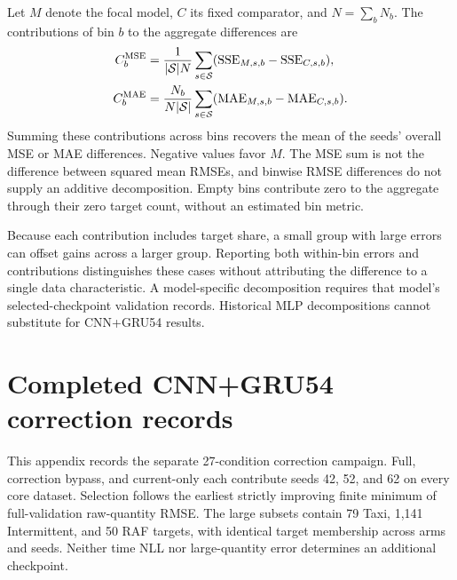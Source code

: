 \documentclass[runningheads]{llncs}
\begin{document}
Let $M$ denote the focal model, $C$ its fixed comparator, and
$N=\sum_bN_b$. The contributions of bin $b$ to the aggregate differences are
\begin{align}
 C_b^{\rm MSE}&=\frac{1}{|\mathcal S|N}\sum_{s\in\mathcal S}
  (\mathrm{SSE}_{M,s,b}-\mathrm{SSE}_{C,s,b}),
  \label{eq:strata-mse-contribution}\\
 C_b^{\rm MAE}&=\frac{N_b}{N|\mathcal S|}\sum_{s\in\mathcal S}
  (\mathrm{MAE}_{M,s,b}-\mathrm{MAE}_{C,s,b}).
  \label{eq:strata-mae-contribution}
\end{align}
Summing these contributions across bins recovers the mean of the seeds'
overall MSE or MAE differences. Negative values favor $M$. The MSE sum is
not the difference between squared mean RMSEs, and binwise RMSE differences
do not supply an additive decomposition. Empty bins contribute zero to the
aggregate through their zero target count, without an estimated bin metric.

Because each contribution includes target share, a small group with large
errors can offset gains across a larger group. Reporting both within-bin
errors and contributions distinguishes these cases without attributing the
difference to a single data characteristic. A model-specific decomposition
requires that model's selected-checkpoint validation records. Historical
MLP decompositions cannot substitute for CNN+GRU54 results.

\clearpage
\section{Completed CNN+GRU54 correction records}
\label{app:history-completed}
This appendix records the separate 27-condition correction campaign. Full, correction bypass, and current-only each contribute seeds 42, 52, and 62 on every core dataset. Selection follows the earliest strictly improving finite minimum of full-validation raw-quantity RMSE. The large subsets contain 79 Taxi, 1,141 Intermittent, and 50 RAF targets, with identical target membership across arms and seeds. Neither time NLL nor large-quantity error determines an additional checkpoint.
\end{document}
